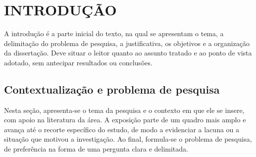 
\chapter{INTRODUÇÃO}
\label{cap:introducao}

A introdução é a parte inicial do texto, na qual se apresentam o tema, a delimitação do problema de pesquisa, a justificativa, os objetivos e a organização da dissertação. Deve situar o leitor quanto ao assunto tratado e ao ponto de vista adotado, sem antecipar resultados ou conclusões.

\section{Contextualização e problema de pesquisa}
\label{sec:problema}

Nesta seção, apresenta-se o tema da pesquisa e o contexto em que ele se insere, com apoio na literatura da área. A exposição parte de um quadro mais amplo e avança até o recorte específico do estudo, de modo a evidenciar a lacuna ou a situação que motivou a investigação. Ao final, formula-se o problema de pesquisa, de preferência na forma de uma pergunta clara e delimitada.

